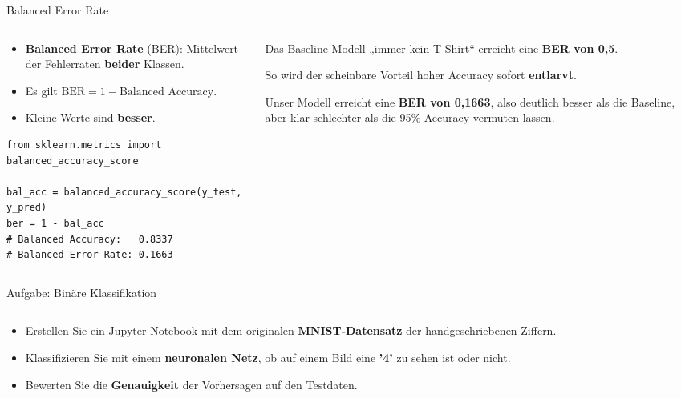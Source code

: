 \begin{frame}[fragile]{Balanced Error Rate}
  \footnotesize

\begin{columns}
\begin{column}{0.60\textwidth}
 
\begin{itemize}
\item \textbf{Balanced Error Rate} (BER): Mittelwert der Fehlerraten \textbf{beider} Klassen.
\item Es gilt $\text{BER} = 1 - \text{Balanced Accuracy}$.
\item Kleine Werte sind \textbf{besser}.
\end{itemize}

\vspace{0.3em}
\begin{verbatim}
from sklearn.metrics import balanced_accuracy_score

bal_acc = balanced_accuracy_score(y_test, y_pred)
ber = 1 - bal_acc
# Balanced Accuracy:   0.8337
# Balanced Error Rate: 0.1663
\end{verbatim}
\end{column}
\begin{column}{0.35\textwidth}
Das Baseline-Modell „immer kein T-Shirt“ erreicht eine \textbf{BER von 0{,}5}.

\vspace{0.5em}
So wird der scheinbare Vorteil hoher Accuracy sofort \textbf{entlarvt}.

\vspace{0.5em}
Unser Modell erreicht eine \textbf{BER von 0{,}1663}, also deutlich besser als die Baseline, aber klar schlechter als die 95\% Accuracy vermuten lassen.
\end{column}
\end{columns}
\end{frame}

\makequizpage{\QUIZURL}{\QUIZQRCODE}{\QUIZIMAGE}

\begin{frame}{Aufgabe: Binäre Klassifikation}
\begin{columns}
\begin{column}{0.60\textwidth}
\begin{itemize}
\item Erstellen Sie ein Jupyter-Notebook mit dem originalen \textbf{MNIST-Datensatz} der handgeschriebenen Ziffern.
\item Klassifizieren Sie mit einem \textbf{neuronalen Netz}, ob auf einem Bild eine \textbf{'4'} zu sehen ist oder nicht.
\item Bewerten Sie die \textbf{Genauigkeit} der Vorhersagen auf den Testdaten.
\end{itemize}
\end{column}
\begin{column}{0.35\textwidth}
\centering
{}
\end{column}
\end{columns}
\end{frame}

